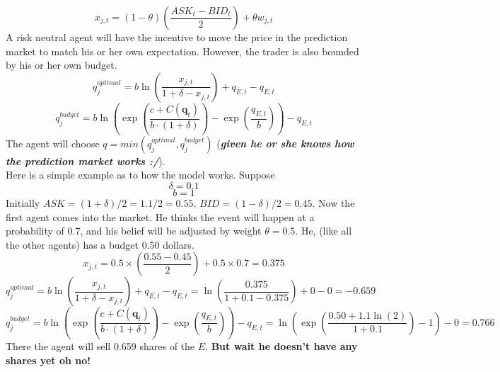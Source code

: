 \documentclass{article}
\begin{document}
\begin{displaymath}
x_{j,t}=(1-\theta)(\frac{ASK_t-BID_t}{2})+\theta w_{j,t}
\end{displaymath}
A risk neutral agent will have the incentive to move the price in the prediction market to match his or her own expectation. However, the trader is also bounded by his or her own budget.
\begin{displaymath}
q_j^{optimal}=b\ln({\frac{x_{j,t}}{1+\delta-x_{j,t}}})+q_{\overline{E},t}-q_{E,t}
\end{displaymath}
\begin{displaymath}
q_j^{budget}=b\ln({\exp(\frac{c+C(\textbf{q}_t)}{b\cdot (1+\delta)})-\exp(\frac{q_{\overline{{E},t}}}{b})})-q_{E,t}
\end{displaymath}
The agent will choose $q=min(q_j^{optimal}, q_j^{budget})$ (\textbf{\emph{given he or she knows how the prediction market works :/}}). \\
Here is a simple example as to how the model works. Suppose
\begin{displaymath}
\delta = 0.1
\end{displaymath}
\begin{displaymath}
b = 1
\end{displaymath}
Initially $ASK=(1+\delta)/2=1.1/2=0.55$, $BID=(1-\delta)/2=0.45$.
Now the first agent comes into the market. He thinks the event will happen at a probability of 0.7, and his belief will be adjusted by weight $\theta=0.5$. He, (like all the other agents) has a budget 0.50 dollars.
\begin{displaymath}
x_{j,t}=0.5\times (\frac{0.55-0.45}{2})+0.5\times 0.7=0.375
\end{displaymath}
\begin{displaymath}
q_j^{optimal}=b\ln({\frac{x_{j,t}}{1+\delta-x_{j,t}}})+q_{\overline{E},t}-q_{E,t}=\ln({\frac{0.375}{1+0.1-0.375}})+0-0=-0.659
\end{displaymath}
\begin{displaymath}
q_j^{budget}=b\ln({\exp(\frac{c+C(\textbf{q}_t)}{b\cdot (1+\delta)})-\exp(\frac{q_{\overline{{E}},t}}{b})})-q_{E,t}=\ln({\exp(\frac{0.50+1.1\ln(2)}{1+0.1})-1})-0=0.766
\end{displaymath}
There the agent will sell 0.659 shares of the $E$. \textbf{But wait he doesn't have any shares yet oh no!}
\end{document}
